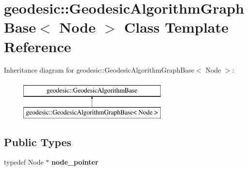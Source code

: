 \hypertarget{classgeodesic_1_1_geodesic_algorithm_graph_base}{}\section{geodesic\+:\+:Geodesic\+Algorithm\+Graph\+Base$<$ Node $>$ Class Template Reference}
\label{classgeodesic_1_1_geodesic_algorithm_graph_base}
Inheritance diagram for geodesic\+:\+:Geodesic\+Algorithm\+Graph\+Base$<$ Node $>$\+:\begin{figure}[H]
\begin{center}
\leavevmode
\includegraphics[height=2.000000cm]{classgeodesic_1_1_geodesic_algorithm_graph_base}
\end{center}
\end{figure}
\subsection*{Public Types}
\begin{DoxyCompactItemize}
\item 
\hypertarget{classgeodesic_1_1_geodesic_algorithm_graph_base_a0926f4142d3390c5e3555163f6b6a2d9}{}typedef Node $\ast$ {\bfseries node\+\_\+pointer}\label{classgeodesic_1_1_geodesic_algorithm_graph_base_a0926f4142d3390c5e3555163f6b6a2d9}

\end{DoxyCompactItemize}
